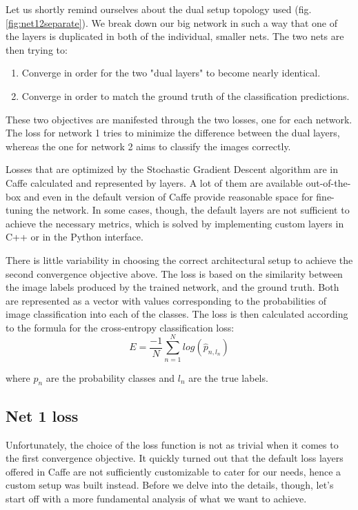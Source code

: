 \documentclass[a4paper, 12pt]{article}
\numberwithin{equation}{section}
\begin{document}
	Let us shortly remind ourselves about the dual setup topology used (fig. \ref{fig:net12separate}). We break down our big network in such a way that one of the layers is duplicated in both of the individual, smaller nets. The two nets are then trying to:
	\begin{enumerate}
		\item Converge in order for the two "dual layers" to become nearly identical.
		\item Converge in order to match the ground truth of the classification predictions.
	\end{enumerate}

	These two objectives are manifested through the two losses, one for each network. The loss for network 1 tries to minimize the difference between the dual layers, whereas the one for network 2 aims to classify the images correctly.
	
	Losses that are optimized by the Stochastic Gradient Descent algorithm are in Caffe calculated and represented by layers. A lot of them are available out-of-the-box and even in the default version of Caffe provide reasonable space for fine-tuning the network. In some cases, though, the default layers are not sufficient to achieve the necessary metrics, which is solved by implementing custom layers in C++ or in the Python interface.
		
	There is little variability in choosing the correct architectural setup to achieve the second convergence objective above. The loss is based on the similarity between the image labels produced by the trained network, and the ground truth. Both are represented as a vector with values corresponding to the probabilities of image classification into each of the classes. The loss is then calculated according to the formula for the cross-entropy classification loss:
	\begin{equation}
		E = \frac{-1}{N} \sum_{n=1}^{N} log(\hat{p}_{n,l_n})
	\end{equation}
	
	where $\hat{p}_n$ are the probability classes and $l_n$ are the true labels.
	
	\subsection{Net 1 loss}
	
	Unfortunately, the choice of the loss function is not as trivial when it comes to the first convergence objective. It quickly turned out that the default loss layers offered in Caffe are not sufficiently customizable to cater for our needs, hence a custom setup was built instead. Before we delve into the details, though, let's start off with a more fundamental analysis of what we want to achieve.
	
\end{document}
